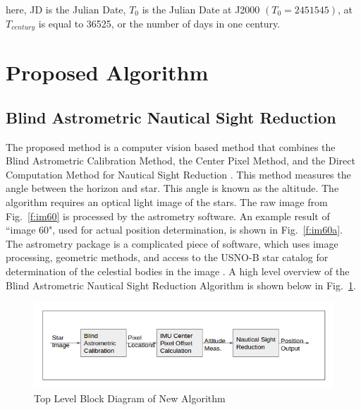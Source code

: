 \documentclass[12pt,a4paper]{book}
\begin{document}
here, JD is the Julian Date, $T_{0}$ is the Julian Date at J2000 $(T_{0} = 2451545)$, at $T_{century}$ is equal to 36525, or the number of days in one century.

\section{Proposed Algorithm}
\subsection{Blind Astrometric Nautical Sight Reduction}
The proposed method is a computer vision based method that combines the Blind Astrometric Calibration Method, the Center Pixel Method, and the Direct Computation Method for Nautical Sight Reduction \cite{b:naut}.  This method measures the angle between the horizon and star.  This angle is known as the altitude.  The algorithm requires an optical light image of the stars. The raw image from Fig.~\ref{f:im60} is processed by the astrometry software.  An example result of ``image 60", used for actual position determination, is shown in Fig.~\ref{f:im60a}. The astrometry package is a complicated piece of software, which uses image processing, geometric methods, and access to the USNO-B star catalog for determination of the celestial bodies in the image \cite{b:astro}.  A high level overview of the Blind Astrometric Nautical Sight Reduction Algorithm is shown below in Fig.~\ref{f:diagram}.
\begin{figure}[!ht]
\centering
\includegraphics[width=12cm]{diagram.png}
\caption{Top Level Block Diagram of New Algorithm}
\label{f:diagram}
\end{figure}
\end{document}
